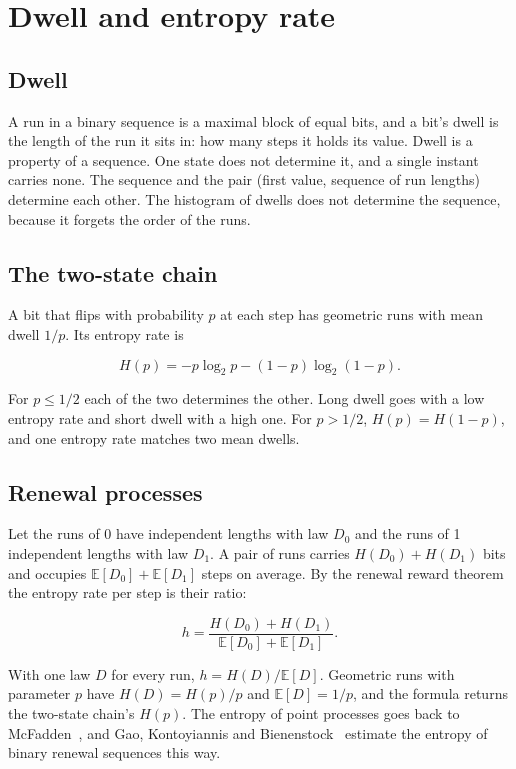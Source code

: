 \chapter{\texorpdfstring{Dwell and entropy rate}{Dwell and entropy rate}}
\label{chap:dwell-and-entropy}

\section{\texorpdfstring{Dwell}{Dwell}}

A run in a binary sequence is a maximal block of equal bits, and a bit's dwell is the length of the run it sits in: how many steps it holds its value. Dwell is a property of a sequence. One state does not determine it, and a single instant carries none. The sequence and the pair (first value, sequence of run lengths) determine each other. The histogram of dwells does not determine the sequence, because it forgets the order of the runs.

\section{\texorpdfstring{The two-state chain}{The two-state chain}}

A bit that flips with probability \(p\) at each step has geometric runs with mean dwell \(1/p\). Its entropy rate is

\[
H(p) = -p \log_2 p - (1 - p)\log_2(1 - p).
\]

For \(p \le 1/2\) each of the two determines the other. Long dwell goes with a low entropy rate and short dwell with a high one. For \(p > 1/2\), \(H(p) = H(1 - p)\), and one entropy rate matches two mean dwells.

\section{\texorpdfstring{Renewal processes}{Renewal processes}}

Let the runs of 0 have independent lengths with law \(D_0\) and the runs of 1 independent lengths with law \(D_1\). A pair of runs carries \(H(D_0) + H(D_1)\) bits and occupies \(\mathbb{E}[D_0] + \mathbb{E}[D_1]\) steps on average. By the renewal reward theorem the entropy rate per step is their ratio:

\[
h = \frac{H(D_0) + H(D_1)}{\mathbb{E}[D_0] + \mathbb{E}[D_1]}.
\]

With one law \(D\) for every run, \(h = H(D)/\mathbb{E}[D]\). Geometric runs with parameter \(p\) have \(H(D) = H(p)/p\) and \(\mathbb{E}[D] = 1/p\), and the formula returns the two-state chain's \(H(p)\). The entropy of point processes goes back to McFadden~\cite{src:McFadden-1965}, and Gao, Kontoyiannis and Bienenstock~\cite{src:Gao-Kontoyiannis-Bienenstock-2008} estimate the entropy of binary renewal sequences this way.

